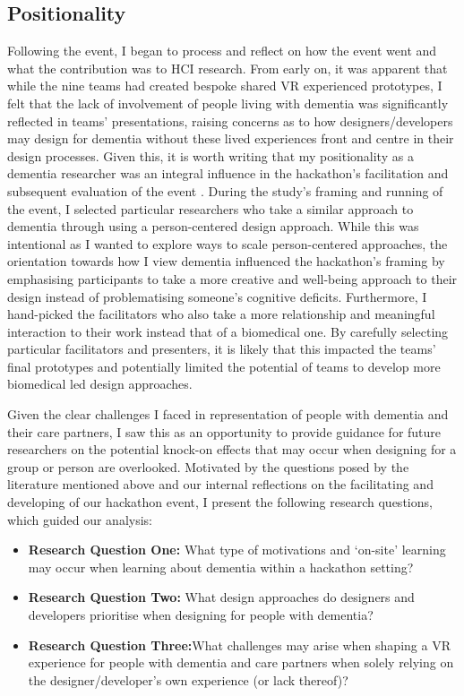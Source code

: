 \subsection{Positionality}
\label{method:positionality}
Following the event, I began to process and reflect on how the event went and what the contribution was to HCI research. From early on, it was apparent that while the nine teams had created bespoke shared VR experienced prototypes, I felt that the lack of involvement of people living with dementia was significantly reflected in teams' presentations, raising concerns as to how designers/developers may design for dementia without these lived experiences front and centre in their design processes. Given this, it is worth writing that my positionality as a dementia researcher was an integral influence in the hackathon's facilitation and subsequent evaluation of the event \citep{bourke_positionality_2014}. During the study's framing and running of the event, I selected particular researchers who take a similar approach to dementia through using a person-centered design approach. While this was intentional as I wanted to explore ways to scale person-centered approaches, the orientation towards how I view dementia influenced the hackathon's framing by emphasising participants to take a more creative and well-being approach to their design instead of problematising someone's cognitive deficits. Furthermore, I hand-picked the facilitators who also take a more relationship and meaningful interaction to their work instead that of a biomedical one. By carefully selecting particular facilitators and presenters, it is likely that this impacted the teams' final prototypes and potentially limited the potential of teams to develop more biomedical led design approaches. 

Given the clear challenges I faced in representation of people with dementia and their care partners, I saw this as an opportunity to provide guidance for future researchers on the potential knock-on effects that may occur when designing for a group or person are overlooked. Motivated by the questions posed by the literature mentioned above and our internal reflections on the facilitating and developing of our hackathon event, I present the following research questions, which guided our analysis:

\begin{itemize}
    \item \textbf{Research Question One:} What type of motivations and ‘on-site’ learning may occur when learning about dementia within a hackathon setting?
    \item \textbf{Research Question Two:} What design approaches do designers and developers prioritise when designing for people with dementia?
    \item \textbf{Research Question Three:}What challenges may arise when shaping a VR experience for people with dementia and care partners when solely relying on the designer/developer’s own experience (or lack thereof)?
\end{itemize}

